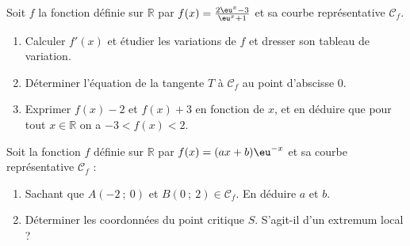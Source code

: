 \documentclass[main.tex]{subfiles}
\begin{document}
\begin{exercise} \label{chapter06:exercice:exp:derivation6}
 	Soit $f$ la fonction définie sur $\mathbb{R}$ par $f(x)=\tfrac{2\eu^x-3}{\eu^x+1}$ et sa courbe représentative $\mathscr{C}_f$.
 	\begin{enumerate}[label={\arabic*)},leftmargin=*]
 		\item  Calculer $f'(x)$ et étudier les variations de $f$ et dresser son tableau de variation.
 		\item Déterminer l'équation de la tangente $T$ à $\mathscr{C}_f$ au point d'abscisse $0$.  
 		\item Exprimer $f(x)-2$ et $f(x)+3$ en fonction de $x$, et en déduire  que pour tout $x\in\mathbb{R}$ on a $-3<f(x)<2$.
 	\end{enumerate}
 \end{exercise}
\begin{exercise} \label{chapter06:exercice:exp:derivation7} Soit la fonction $f$ définie sur $\mathbb{R}$ par $f(x)=(ax+b)\eu^{-x}$ et sa courbe représentative $\mathscr{C}_f$ :
	\begin{enumerate}[label={\arabic*)},leftmargin=*]
		\item  Sachant que $A(-2~;~0)$ et $B(0~;~2)\in\mathscr{C}_f$. En déduire $a$	et $b$.
		\item Déterminer les coordonnées du point critique $S$. S'agit-il d'un extremum local ?
\end{enumerate}
\end{exercise}
\end{document}

